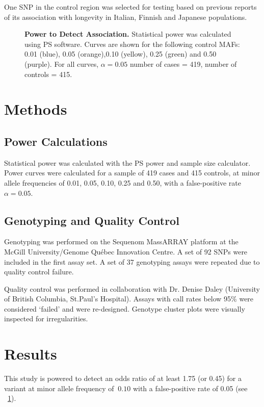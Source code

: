 One \ac{SNP} in the control region was selected for testing based on previous reports of its association with longevity in Italian\cite{zhang2003strikingly}, Finnish and Japanese\cite{niemi2005combination} populations.

\begin{figure}
\noindent{}
  \caption[Statistical Power for Association Test]{
    \small{\textbf{Power to Detect Association.} Statistical power was calculated using PS software\cite{Dupont1990}. Curves are shown for the following control MAFs: 0.01 (blue), 0.05 (orange),0.10 (yellow), 0.25 (green) and 0.50 (purple).  For all curves, $\alpha = 0.05$ number of cases = 419, number of controls = 415.}}
  \label{assoc.fig.power}
\end{figure}

\section{Methods}\label{assoc.methods}

\subsection{Power Calculations}
Statistical power was calculated with the PS power and sample size calculator\cite{Dupont1990}.  Power curves were calculated for a sample of 419 cases and 415 controls, at minor allele frequencies of 0.01, 0.05, 0.10, 0.25 and 0.50, with a false-positive rate $\alpha = 0.05$.

\subsection{Genotyping and Quality Control}
Genotyping was performed on the Sequenom MassARRAY platform at the McGill University/Genome Qu\'{e}bec Innovation Centre.  A set of 92 SNPs were included in the first assay set.  A set of 37 genotyping assays were repeated due to quality control failure.

Quality control was performed in collaboration with Dr. Denise Daley (University of British Columbia, St.Paul's Hospital).  Assays with call rates below 95\% were considered `failed' and were re-designed.  Genotype cluster plots were visually inspected for irregularities.

\section{Results}
This study is powered to detect an odds ratio of at least 1.75 (or 0.45) for a variant at minor allele frequency of $\> 0.10$ with a false-positive rate of 0.05 (see ~\ref{assoc.fig.power}).

